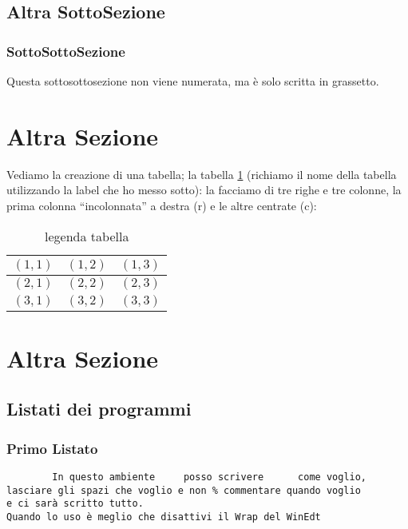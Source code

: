 \subsection{Altra SottoSezione}
\subsubsection{SottoSottoSezione}Questa sottosottosezione non viene
numerata, ma \`e solo scritta in grassetto.
\section{Altra Sezione}                 %
Vediamo la creazione di una tabella; la tabella \ref{tab:uno}
(richiamo il nome della tabella utilizzando la label che ho messo sotto):
la facciamo di tre righe e tre colonne, la prima colonna
``incolonnata'' a destra (r) e le altre centrate (c):\\
\begin{table}[h]                        %
\begin{center}                          %
\begin{tabular}{r|c|c}                  %
\hline \hline                           %
$(1,1)$ & $(1,2)$ & $(1,3)$\\           %
\hline                                  %
$(2,1)$ & $(2,2)$ & $(2,3)$\\           %
\hline                                  %
$(3,1)$ & $(3,2)$ & $(3,3)$\\
\hline \hline                           %
\end{tabular}
\caption[legenda elenco tabelle]{legenda tabella}\label{tab:uno}
\end{center}
\end{table}
\section{Altra Sezione}\label{sec:prova}%
\subsection{Listati dei programmi}
\subsubsection{Primo Listato}
\begin{verbatim}
        In questo ambiente     posso scrivere      come voglio,
lasciare gli spazi che voglio e non % commentare quando voglio
e ci sarà scritto tutto.
Quando lo uso è meglio che disattivi il Wrap del WinEdt
\end{verbatim}